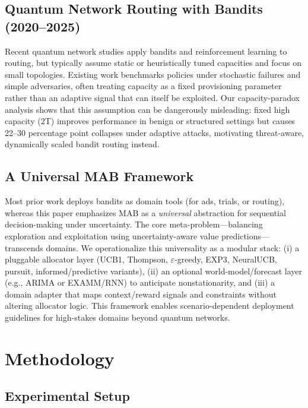\documentclass[11pt,a4paper]{article}
\begin{document}
\subsection{Quantum Network Routing with Bandits (2020--2025)}

Recent quantum network studies apply bandits and reinforcement learning to routing, but typically assume static or heuristically tuned capacities and focus on small topologies. Existing work benchmarks policies under stochastic failures and simple adversaries, often treating capacity as a fixed provisioning parameter rather than an adaptive signal that can itself be exploited. Our capacity-paradox analysis shows that this assumption can be dangerously misleading: fixed high capacity (2T) improves performance in benign or structured settings but causes 22--30 percentage point collapses under adaptive attacks, motivating threat-aware, dynamically scaled bandit routing instead.

\subsection{A Universal MAB Framework}

Most prior work deploys bandits as domain tools (for ads, trials, or routing), whereas this paper emphasizes MAB as a \emph{universal} abstraction for sequential decision-making under uncertainty. The core meta-problem—balancing exploration and exploitation using uncertainty-aware value predictions—transcends domains. We operationalize this universality as a modular stack: (i) a pluggable allocator layer (UCB1, Thompson, $\varepsilon$-greedy, EXP3, NeuralUCB, pursuit, informed/predictive variants), (ii) an optional world-model/forecast layer (e.g., ARIMA or EXAMM/RNN) to anticipate nonstationarity, and (iii) a domain adapter that maps context/reward signals and constraints without altering allocator logic. This framework enables scenario-dependent deployment guidelines for high-stakes domains beyond quantum networks.

\section{Methodology}
\label{sec:methodology}

\subsection{Experimental Setup}
\end{document}
